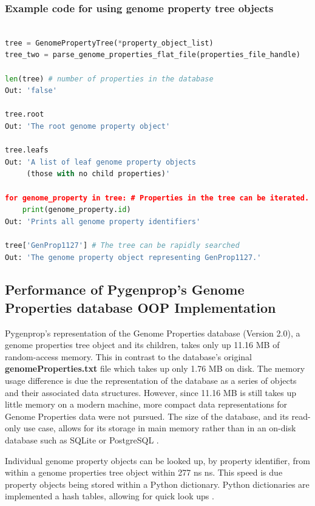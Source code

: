 \pagebreak

\subsubsection{Example code for using genome property tree objects}

\begin{lstlisting}[language=Python]

tree = GenomePropertyTree(*property_object_list)
tree_two = parse_genome_properties_flat_file(properties_file_handle)
	
len(tree) # number of properties in the database
Out: 'false'

tree.root
Out: 'The root genome property object'

tree.leafs
Out: 'A list of leaf genome property objects 
     (those with no child properties)'

for genome_property in tree: # Properties in the tree can be iterated.
	print(genome_property.id)
Out: 'Prints all genome property identifiers'

tree['GenProp1127'] # The tree can be rapidly searched
Out: 'The genome property object representing GenProp1127.'

\end{lstlisting}

\subsection{Performance of Pygenprop's Genome Properties database OOP Implementation}

Pygenprop's representation of the Genome Properties database (Version 2.0), a genome properties tree object and its children, takes only up 11.16 MB of random-access memory. This in contrast to the database's original \textbf{genomeProperties.txt} file which takes up only 1.76 MB on disk. The memory usage difference is due the representation of the database as a series of objects and their associated data structures. However, since 11.16 MB is still takes up little memory on a modern machine, more compact data representations for Genome Properties data were not pursued. The size of the database, and its read-only use case, allows for its storage in main memory rather than in an on-disk database such as SQLite \cite{owens2006definitive} or PostgreSQL \cite{momjian2001postgresql}.

Individual genome property objects can be looked up, by property identifier, from within a genome properties tree object within 277 ns  ns. This speed is due property objects being stored within a Python dictionary. Python dictionaries are implemented a hash tables, allowing for quick look ups \cite{van1995python}.

